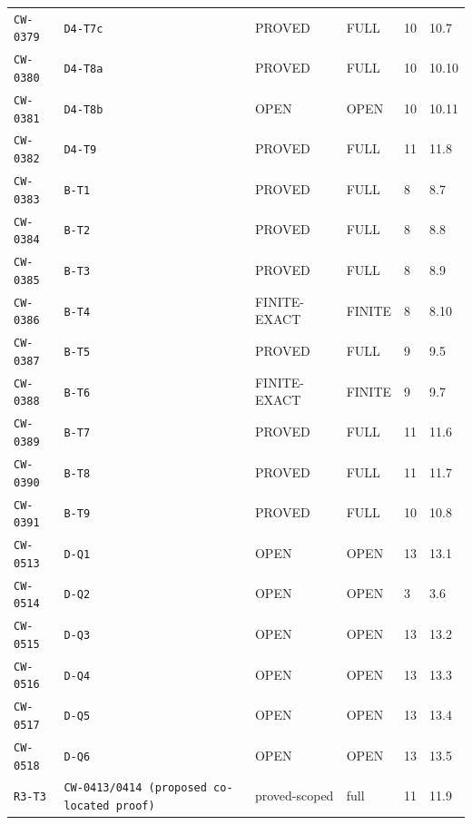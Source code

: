 \begin{center}
\begin{longtable}{@{}llllll@{}}
\texttt{CW-0379} & \texttt{D4-T7c} & PROVED & FULL & 10 & 10.7\\
\texttt{CW-0380} & \texttt{D4-T8a} & PROVED & FULL & 10 & 10.10\\
\texttt{CW-0381} & \texttt{D4-T8b} & OPEN & OPEN & 10 & 10.11\\
\texttt{CW-0382} & \texttt{D4-T9} & PROVED & FULL & 11 & 11.8\\
\texttt{CW-0383} & \texttt{B-T1} & PROVED & FULL & 8 & 8.7\\
\texttt{CW-0384} & \texttt{B-T2} & PROVED & FULL & 8 & 8.8\\
\texttt{CW-0385} & \texttt{B-T3} & PROVED & FULL & 8 & 8.9\\
\texttt{CW-0386} & \texttt{B-T4} & FINITE-EXACT & FINITE & 8 & 8.10\\
\texttt{CW-0387} & \texttt{B-T5} & PROVED & FULL & 9 & 9.5\\
\texttt{CW-0388} & \texttt{B-T6} & FINITE-EXACT & FINITE & 9 & 9.7\\
\texttt{CW-0389} & \texttt{B-T7} & PROVED & FULL & 11 & 11.6\\
\texttt{CW-0390} & \texttt{B-T8} & PROVED & FULL & 11 & 11.7\\
\texttt{CW-0391} & \texttt{B-T9} & PROVED & FULL & 10 & 10.8\\
\texttt{CW-0513} & \texttt{D-Q1} & OPEN & OPEN & 13 & 13.1\\
\texttt{CW-0514} & \texttt{D-Q2} & OPEN & OPEN & 3 & 3.6\\
\texttt{CW-0515} & \texttt{D-Q3} & OPEN & OPEN & 13 & 13.2\\
\texttt{CW-0516} & \texttt{D-Q4} & OPEN & OPEN & 13 & 13.3\\
\texttt{CW-0517} & \texttt{D-Q5} & OPEN & OPEN & 13 & 13.4\\
\texttt{CW-0518} & \texttt{D-Q6} & OPEN & OPEN & 13 & 13.5\\
\texttt{R3-T3} & \texttt{CW-0413/0414 (proposed co-located proof)} & proved-scoped & full & 11 & 11.9\\
\bottomrule\end{longtable}
\end{center}
